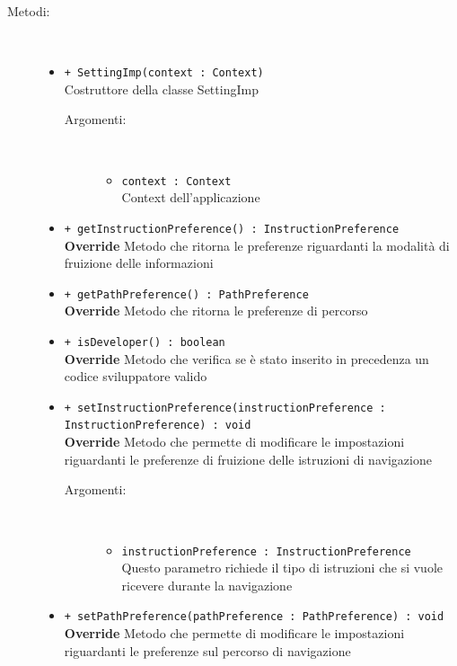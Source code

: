 \documentclass[../DefinizioneDiProdotto.tex]{subfiles}
\begin{document}
\begin{description}
\begin{itemize}
	\end{itemize}
	\item[Metodi:] \
	\begin{itemize}
		\item \texttt{+ SettingImp(context : Context)}\\
		Costruttore della classe SettingImp
		\begin{description}
			\item[Argomenti:] \
			\begin{itemize}
				\item \texttt{context : Context}\\
				Context dell'applicazione\end{itemize}
		\end{description}
		\item \texttt{+ getInstructionPreference() : InstructionPreference}\\
		\textbf{Override} Metodo che ritorna le preferenze riguardanti la modalità di fruizione delle informazioni
		\item \texttt{+ getPathPreference() : PathPreference}\\
		\textbf{Override} Metodo che ritorna le preferenze di percorso
		\item \texttt{+ isDeveloper() : boolean}\\
		\textbf{Override} Metodo che verifica se è stato inserito in precedenza un codice sviluppatore valido
		\item \texttt{+ setInstructionPreference(instructionPreference : InstructionPreference) : void}\\
		\textbf{Override} Metodo che permette di modificare le impostazioni riguardanti le preferenze di fruizione delle istruzioni di navigazione
		\begin{description}
			\item[Argomenti:] \
			\begin{itemize}
				\item \texttt{instructionPreference : InstructionPreference}\\
				Questo parametro richiede il tipo di istruzioni che si vuole ricevere durante la navigazione \end{itemize}
		\end{description}
		\item \texttt{+ setPathPreference(pathPreference : PathPreference) : void}\\
		\textbf{Override} Metodo che permette di modificare le impostazioni riguardanti le preferenze sul percorso di navigazione

\end{itemize}
\end{description}
\end{document}
